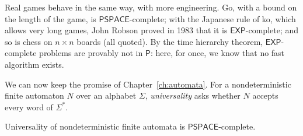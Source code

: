 Real games behave in the same way, with more engineering. Go, with a bound on the length of the game, is $\mathsf{PSPACE}$-complete; with the Japanese rule of ko, which allows very long games, John Robson proved in 1983 that it is $\mathsf{EXP}$-complete; and so is chess on $n\times n$ boards (all quoted). By the time hierarchy theorem, $\mathsf{EXP}$-complete problems are provably not in $\mathsf P$: here, for once, we know that no fast algorithm exists.

We can now keep the promise of Chapter~\ref{ch:automata}. For a nondeterministic finite automaton $N$ over an alphabet $\Sigma$, \emph{universality} asks whether $N$ accepts every word of $\Sigma^*$.

\begin{theorem}\label{thm:nfauniversal}
Universality of nondeterministic finite automata is $\mathsf{PSPACE}$-complete.
\end{theorem}

